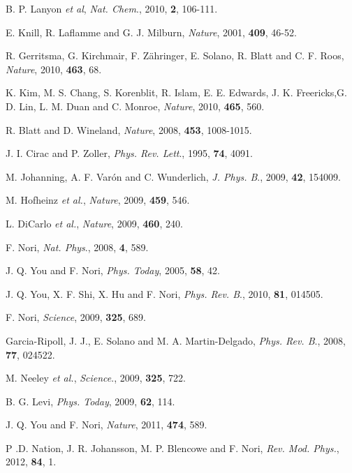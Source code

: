\documentclass[8.5pt,twoside,twocolumn]{article}
\begin{document}
\begin{thebibliography}{99}
B. P. Lanyon  \emph{et al}, \emph{Nat. Chem}., 2010, \textbf{2}, 106-111.

E. Knill, R. Laflamme and G. J. Milburn, \emph{Nature}, 2001, \textbf{409}, 46-52.


R. Gerritsma, G. Kirchmair, F. Z\"{a}hringer, E. Solano, R. Blatt and C. F. Roos, \emph{Nature}, 2010, \textbf{463}, 68.

K. Kim, M. S. Chang, S. Korenblit, R. Islam, E. E. Edwards, J. K. Freericks,G. D. Lin, L. M. Duan and C. Monroe, \emph{Nature}, 2010, \textbf{465}, 560.

R. Blatt and D. Wineland, \emph{Nature}, 2008, \textbf{453}, 1008-1015.

J. I. Cirac and P. Zoller, \emph{Phys. Rev. Lett}., 1995, \textbf{74}, 4091.

M. Johanning, A. F. Var\'{o}n and C. Wunderlich, \emph{J. Phys. B}., 2009, \textbf{42}, 154009.

M. Hofheinz \emph{et al.}, \emph{Nature}, 2009, \textbf{459}, 546.

L. DiCarlo \emph{et al.}, \emph{Nature}, 2009, \textbf{460}, 240.

F. Nori, \emph{Nat. Phys}., 2008, \textbf{4}, 589.

J. Q. You and F. Nori, \emph{Phys. Today}, 2005, \textbf{58}, 42.

J. Q. You, X. F. Shi, X. Hu and F. Nori, \emph{Phys. Rev. B}., 2010, \textbf{81}, 014505.

F. Nori, \emph{Science}, 2009, \textbf{325}, 689.

Garcia-Ripoll, J. J., E. Solano and M. A. Martin-Delgado, \emph{Phys. Rev. B}., 2008, \textbf{77}, 024522.

M. Neeley \emph{et al.}, \emph{Science}., 2009, \textbf{325}, 722.

B. G. Levi, \emph{Phys. Today}, 2009, \textbf{62}, 114.

J. Q. You and F. Nori, \emph{Nature}, 2011, \textbf{474}, 589.

P .D. Nation, J. R. Johansson, M. P. Blencowe and F. Nori, \emph{Rev. Mod. Phys.}, 2012, \textbf{84}, 1.


\end{thebibliography}
\end{document}
